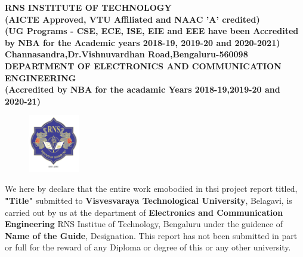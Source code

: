 %
\setlength{\toptafiddle}{1in}
\setlength{\bottafiddle}{1in}
\vspace*{-0.5in}
\enlargethispage{\bottafiddle}
\thispagestyle{empty}


\begin{center}
\small\textbf{	RNS INSTITUTE OF TECHNOLOGY\\
(AICTE Approved, VTU Affiliated and NAAC 'A' credited)\\
(UG Programs - CSE, ECE, ISE, EIE and EEE have been Accredited by NBA for the Academic years 2018-19, 2019-20 and 2020-2021)\\
Channasandra,Dr.Vishnuvardhan Road,Bengaluru-560098\\
\vspace{0.3cm}
DEPARTMENT OF ELECTRONICS AND COMMUNICATION ENGINEERING\\
(Accredited by NBA for the acadamic Years 2018-19,2019-20 and 2020-21)
}
\end{center}

\begin{center}
\begin{figure}[h]
\centering
\includegraphics[height=2.5cm]{images/rns1.jpg}
\end{figure}
\Large{\textbf{\color{red}{DECLARATION}}}
\end{center}

We here by declare that the entire work emobodied in thsi project report titled, \textbf{\color{red}"Title"} submitted to \textbf{\color{red}Visvesvaraya Technological University}, Belagavi, is carried out by us at the department of \textbf{\color{blue}Electronics and Communication Engineering} RNS Institue of Technology, Bengaluru under the guidence of \textbf{\color{blue}Name of the Guide}, Designation. This report has not been submitted in part or full for the reward of any Diploma or degree of this or any other university.


